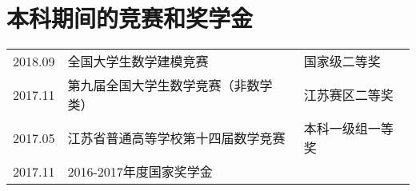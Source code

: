 \documentclass[]{deedy-resume-openfont}
\begin{document}
\begin{minipage}[t]{0.77\textwidth}

	\section{本科期间的竞赛和奖学金}
    \begin{tabular}{lll}
        2018.09 & 全国大学生数学建模竞赛 & 国家级二等奖 \\
        2017.11 & 第九届全国大学生数学竞赛（非数学类） & 江苏赛区二等奖 \\
        2017.05 & 江苏省普通高等学校第十四届数学竞赛 & 本科一级组一等奖\\
        2017.11 & 2016-2017年度国家奖学金 & \\
	\end{tabular}
    \sectionsep
\end{minipage}
\end{document}
